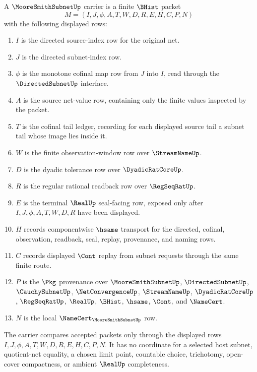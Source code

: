 \begin{definition}
\label{def:moore-smith-subnet-carrier}
A $\MooreSmithSubnetUp$ carrier is a finite $\BHist$ packet
$$
M=(I,J,\phi,A,T,W,D,R,E,H,C,P,N)
$$
with the following displayed rows:
\begin{enumerate}
\item $I$ is the directed source-index row for the original net.
\item $J$ is the directed subnet-index row.
\item $\phi$ is the monotone cofinal map row from $J$ into $I$, read through the $\DirectedSubnetUp$ interface.
\item $A$ is the source net-value row, containing only the finite values inspected by the packet.
\item $T$ is the cofinal tail ledger, recording for each displayed source tail a subnet tail whose image lies inside it.
\item $W$ is the finite observation-window row over $\StreamNameUp$.
\item $D$ is the dyadic tolerance row over $\DyadicRatCoreUp$.
\item $R$ is the regular rational readback row over $\RegSeqRatUp$.
\item $E$ is the terminal $\RealUp$ seal-facing row, exposed only after $I,J,\phi,A,T,W,D,R$ have been displayed.
\item $H$ records componentwise $\hsame$ transport for the directed, cofinal, observation, readback, seal, replay, provenance, and naming rows.
\item $C$ records displayed $\Cont$ replay from subnet requests through the same finite route.
\item $P$ is the $\Pkg$ provenance over $\MooreSmithSubnetUp$, $\DirectedSubnetUp$, $\CauchySubnetUp$, $\NetConvergenceUp$, $\StreamNameUp$, $\DyadicRatCoreUp$, $\RegSeqRatUp$, $\RealUp$, $\BHist$, $\hsame$, $\Cont$, and $\NameCert$.
\item $N$ is the local $\NameCert_{\MooreSmithSubnetUp}$ row.
\end{enumerate}
The carrier compares accepted packets only through the displayed rows $I,J,\phi,A,T,W,D,R,E,H,C,P,N$. It has no coordinate for a selected host subnet, quotient-net equality, a chosen limit point, countable choice, trichotomy, open-cover compactness, or ambient $\RealUp$ completeness.
\end{definition}

